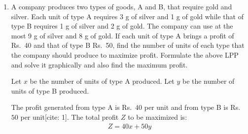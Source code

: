 \begin{enumerate}[label=\thesubsection.\arabic*, ref=\thesubsection.\theenumi]
Applying $R_1 \to R_1 + R_3$ and $R_2 \to R_2 - 3R_3$:
\begin{align*}
	\begin{bmatrix}
		1 & 0 & 0 \\
		0 & 1 & 0 \\
		0 & 0 & 1
	\end{bmatrix}
	&=
	\begin{bmatrix}
		-2 + 5 & 1 + (-2) & -1 + 2 \\
		0 - 3(5) & 0 - 3(-2) & 1 - 3(2) \\
		5 & -2 & 2
	\end{bmatrix}
	A \\
	\begin{bmatrix}
		1 & 0 & 0 \\
		0 & 1 & 0 \\
		0 & 0 & 1
	\end{bmatrix}
	&=
	\begin{bmatrix}
		3 & -1 & 1 \\
		-15 & 6 & -5 \\
		5 & -2 & 2
	\end{bmatrix}
	A
\end{align*}

Since $I = A^{-1}A$, the inverse of matrix $A$ is:
\begin{align*}
	A^{-1} = \begin{bmatrix}
		3 & -1 & 1 \\
		-15 & 6 & -5 \\
		5 & -2 & 2
	\end{bmatrix}
\end{align*}

\item A company produces two types of goods, A and B, that require gold and silver. Each unit of type A requires 3 g of silver and 1 g of gold while that of type B requires 1 g of silver and 2 g of gold. The company can use at the most 9 g of silver and 8 g of gold. If each unit of type A brings a profit of Rs.~40 and that of type B Rs.~50, find the number of units of each type that the company should produce to maximize profit. Formulate the above LPP and solve it graphically and also find the maximum profit.

\solution
Let $x$ be the number of units of type A produced.
Let $y$ be the number of units of type B produced.

The profit generated from type A is Rs.~$40$ per unit and from type B is Rs.~$50$ per unit[cite: 1].
The total profit $Z$ to be maximized is:
\begin{align*}
	Z = 40x + 50y
\end{align*}


\end{enumerate}
